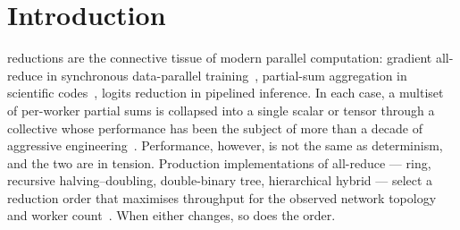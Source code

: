 \documentclass[journal,10pt]{IEEEtran}
\theoremstyle{plain}
\theoremstyle{definition}
\theoremstyle{remark}
\begin{document}
\maketitle
\IEEEdisplaynontitleabstractindextext
\IEEEpeerreviewmaketitle


\section{Introduction}\label{sec:intro}

 reductions are the connective tissue of modern
parallel computation: gradient all-reduce in synchronous data-parallel
training~\cite{sergeev2018horovod,li2020pytorch}, partial-sum aggregation in
scientific codes~\cite{dongarra2011hpcchallenge}, logits reduction in
pipelined inference. In each case, a multiset of per-worker partial sums is
collapsed into a single scalar or tensor through a collective whose
performance has been the subject of more than a decade of aggressive
engineering~\cite{thakur2005optimization,nccl2018,cai2021synthesizing,shah2023taccl}.
Performance, however, is not the same as determinism, and the two are in
tension. Production implementations of all-reduce --- ring, recursive
halving--doubling, double-binary tree, hierarchical hybrid --- select a
reduction order that maximises throughput for the observed network topology
and worker count~\cite{rabenseifner2004optimization,nccl2018}.  When either
changes, so does the order.
\end{document}
